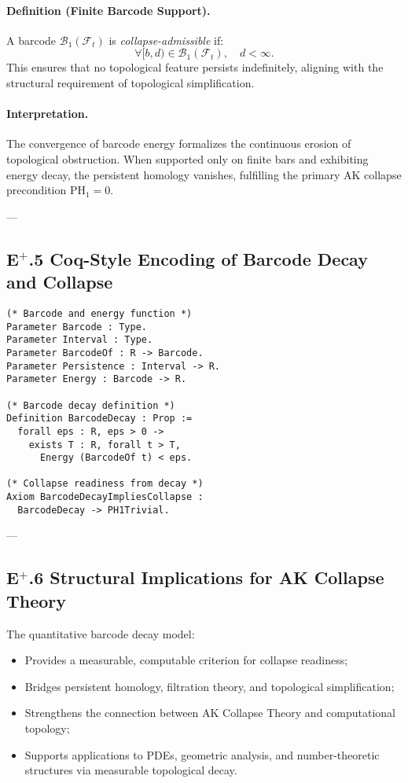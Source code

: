 \documentclass[11pt]{article}
\begin{document}
\paragraph{Definition (Finite Barcode Support).}
A barcode $\mathcal{B}_1(\mathcal{F}_t)$ is \emph{collapse-admissible} if:
\[
\forall [b,d) \in \mathcal{B}_1(\mathcal{F}_t), \quad d < \infty.
\]
This ensures that no topological feature persists indefinitely, aligning with the structural requirement of topological simplification.

\paragraph{Interpretation.}
The convergence of barcode energy formalizes the continuous erosion of topological obstruction. When supported only on finite bars and exhibiting energy decay, the persistent homology vanishes, fulfilling the primary AK collapse precondition $\mathrm{PH}_1 = 0$.

---

\subsection*{E$^{+}$.5 Coq-Style Encoding of Barcode Decay and Collapse}

\begin{lstlisting}[language=Coq]
(* Barcode and energy function *)
Parameter Barcode : Type.
Parameter Interval : Type.
Parameter BarcodeOf : R -> Barcode.
Parameter Persistence : Interval -> R.
Parameter Energy : Barcode -> R.

(* Barcode decay definition *)
Definition BarcodeDecay : Prop :=
  forall eps : R, eps > 0 ->
    exists T : R, forall t > T,
      Energy (BarcodeOf t) < eps.

(* Collapse readiness from decay *)
Axiom BarcodeDecayImpliesCollapse :
  BarcodeDecay -> PH1Trivial.
\end{lstlisting}

---

\subsection*{E$^{+}$.6 Structural Implications for AK Collapse Theory}

The quantitative barcode decay model:

\begin{itemize}
    \item Provides a measurable, computable criterion for collapse readiness;
    \item Bridges persistent homology, filtration theory, and topological simplification;
    \item Strengthens the connection between AK Collapse Theory and computational topology;
    \item Supports applications to PDEs, geometric analysis, and number-theoretic structures via measurable topological decay.
\end{itemize}
\end{document}
